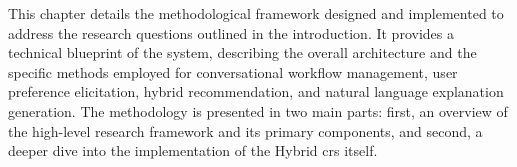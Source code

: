 This chapter details the methodological framework designed and implemented to address the research questions outlined in the introduction. It provides a technical blueprint of the system, describing the overall architecture and the specific methods employed for conversational workflow management, user preference elicitation, hybrid recommendation, and natural language explanation generation. The methodology is presented in two main parts: first, an overview of the high-level research framework and its primary components, and second, a deeper dive into the implementation of the Hybrid \acl{crs} itself.